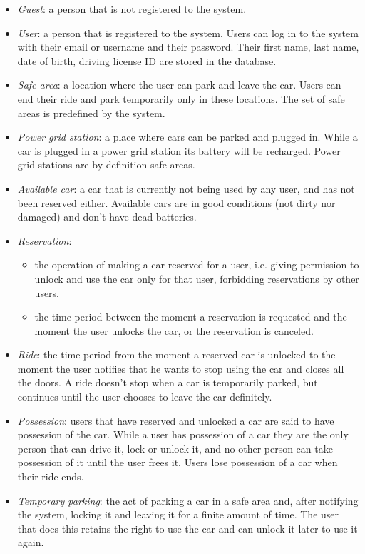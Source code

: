 \documentclass[english]{article}
\begin{document}
\begin{itemize}
\item{\textit{Guest}: a person that is not registered to the system.}
\item{\textit{User}: a person that is registered to the system. Users can log in to the system with their email or username and their password. Their first name, last name, date of birth, driving license ID are stored in the database.}
\item{\textit{Safe area}: a location where the user can park and leave the car. Users can end their ride and park temporarily only in these locations. The set of safe areas is predefined by the system.}
\item{\textit{Power grid station}: a place where cars can be parked and plugged in. While a car is plugged in a power grid station its battery will be recharged. Power grid stations are by definition safe areas.}
\item{\textit{Available car}: a car that is currently not being used by any user, and has not been reserved either. Available cars are in good conditions (not dirty nor damaged) and don’t have dead batteries.}
\item{\textit{Reservation}:
	\begin{itemize}
		\item{the operation of making a car reserved for a user, i.e. giving permission to unlock and use the car only for that user, forbidding reservations by other users.}
		\item{the time period between the moment a reservation is requested and the moment the user unlocks the car, or the reservation is canceled.}
	\end{itemize}
}
\item{\textit{Ride}: the time period from the moment a reserved car is unlocked to the moment the user notifies that he wants to stop using the car and closes all the doors. A ride doesn’t stop when a car is temporarily parked, but continues until the user chooses to leave the car definitely.}
\item{\textit{Possession}: users that have reserved and unlocked a car are said to have possession of the car. While a user has possession of a car they are the only person that can drive it, lock or unlock it, and no other person can take possession of it until the user frees it. Users lose possession of a car when their ride ends.}
\item{\textit{Temporary parking}: the act of parking a car in a safe area and, after notifying the system, locking it and leaving it for a finite amount of time. The user that does this retains the right to use the car and can unlock it later to use it again.}

\end{itemize}
\end{document}
